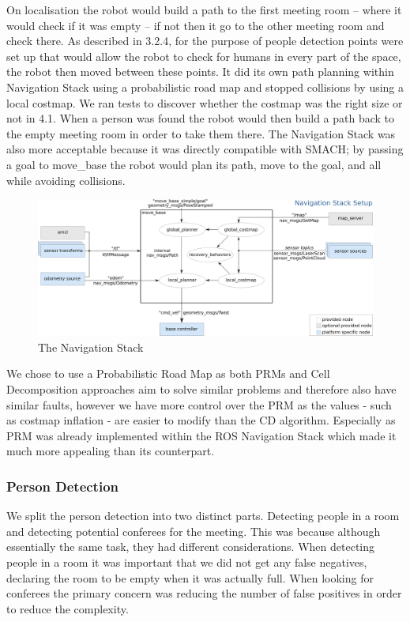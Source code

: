 On localisation the robot would build a path to the first meeting room -- where it would check if it was empty -- if not then it go to the other meeting room and check there. As described in 3.2.4, for the purpose of people detection points were set up that would allow the robot to check for humans in every part of the space, the robot then moved between these points. It did its own path planning within Navigation Stack using a probabilistic road map and stopped collisions by using a local costmap. We ran tests to discover whether the costmap was the right size or not in 4.1. When a person was found the robot would then build a path back to the empty meeting room in order to take them there. The Navigation Stack was also more acceptable because it was directly compatible with SMACH; by passing a goal to move\_base the robot would plan its path, move to the goal, and all while avoiding collisions.

\begin{figure}
\includegraphics[width=\textwidth]{ns}
\caption{The Navigation Stack}
\end{figure}


We chose to use a Probabilistic Road Map as both PRMs and Cell Decomposition approaches aim to solve similar problems and therefore also have similar faults, however we have more control over the PRM as the values - such as costmap inflation - are easier to modify than the CD algorithm. Especially as PRM was already implemented within the ROS Navigation Stack which made it much more appealing than its counterpart.

\subsubsection{Person Detection}

We split the person detection into two distinct parts. Detecting people in a room and detecting potential conferees for the meeting. This was because although essentially the same task, they had different considerations. When detecting people in a room it was important that we did not get any false negatives, declaring the room to be empty when it was actually full. When looking for conferees the primary concern was reducing the number of false positives in order to reduce the complexity.

